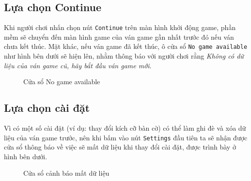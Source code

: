 \subsection{Lựa chọn Continue}
Khi người chơi nhấn chọn nút \verb|Continue| trên màn hình khởi động game, phần mềm sẽ chuyển đến màn hình game của ván game gần nhất trước đó nếu ván chưa kết thúc. Mặt khác, nếu ván game đã kết thúc, ô cửa sổ \verb|No game available| như hình bên dưới sẽ hiện lên, nhằm thông báo với người chơi rằng \textit{Không có dữ liệu của ván game cũ, hãy bắt đầu ván game mới}.
\begin{figure}[H]
\caption{Cửa sổ No game available}
\end{figure}
\subsection{Lựa chọn cài đặt}
Vì có một số cài đặt (ví dụ: thay đổi kích cỡ bàn cờ) có thể làm ghi đè và xóa dữ liệu của ván game trước, nên khi bấm vào nút \verb|Settings| đầu tiên ta sẽ nhận được cửa sổ thông báo về việc sẽ mất dữ liệu khi thay đổi cài đặt, được trình bày ở hình bên dưới.
\begin{figure}[H]
\caption{Cửa sổ cảnh báo mất dữ liệu}
\end{figure}


